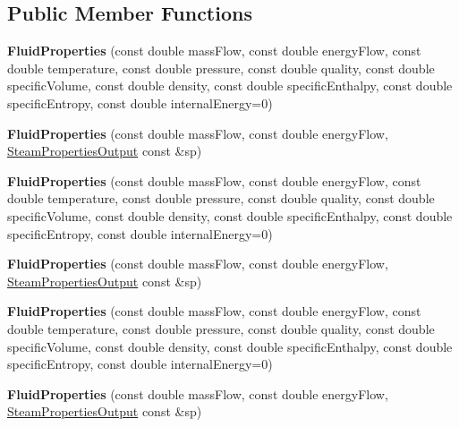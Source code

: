 \subsection*{Public Member Functions}
\begin{DoxyCompactItemize}
\item 
\mbox{\label{struct_steam_system_modeler_tool_1_1_fluid_properties_a6ce10a13b6d676cc1c00fb3fd6712f4b}} 
{\bfseries Fluid\+Properties} (const double mass\+Flow, const double energy\+Flow, const double temperature, const double pressure, const double quality, const double specific\+Volume, const double density, const double specific\+Enthalpy, const double specific\+Entropy, const double internal\+Energy=0)
\item 
\mbox{\label{struct_steam_system_modeler_tool_1_1_fluid_properties_a46758e1dccf1da39bb2924ad13afa470}} 
{\bfseries Fluid\+Properties} (const double mass\+Flow, const double energy\+Flow, \hyperlink{struct_steam_system_modeler_tool_1_1_steam_properties_output}{Steam\+Properties\+Output} const \&sp)
\item 
\mbox{\label{struct_steam_system_modeler_tool_1_1_fluid_properties_a6ce10a13b6d676cc1c00fb3fd6712f4b}} 
{\bfseries Fluid\+Properties} (const double mass\+Flow, const double energy\+Flow, const double temperature, const double pressure, const double quality, const double specific\+Volume, const double density, const double specific\+Enthalpy, const double specific\+Entropy, const double internal\+Energy=0)
\item 
\mbox{\label{struct_steam_system_modeler_tool_1_1_fluid_properties_a46758e1dccf1da39bb2924ad13afa470}} 
{\bfseries Fluid\+Properties} (const double mass\+Flow, const double energy\+Flow, \hyperlink{struct_steam_system_modeler_tool_1_1_steam_properties_output}{Steam\+Properties\+Output} const \&sp)
\item 
\mbox{\label{struct_steam_system_modeler_tool_1_1_fluid_properties_a6ce10a13b6d676cc1c00fb3fd6712f4b}} 
{\bfseries Fluid\+Properties} (const double mass\+Flow, const double energy\+Flow, const double temperature, const double pressure, const double quality, const double specific\+Volume, const double density, const double specific\+Enthalpy, const double specific\+Entropy, const double internal\+Energy=0)
\item 
\mbox{\label{struct_steam_system_modeler_tool_1_1_fluid_properties_a46758e1dccf1da39bb2924ad13afa470}} 
{\bfseries Fluid\+Properties} (const double mass\+Flow, const double energy\+Flow, \hyperlink{struct_steam_system_modeler_tool_1_1_steam_properties_output}{Steam\+Properties\+Output} const \&sp)
\end{DoxyCompactItemize}
